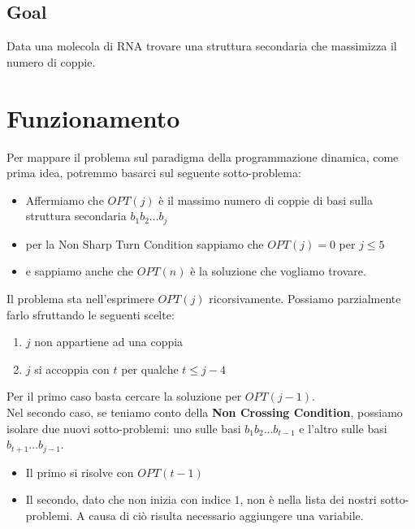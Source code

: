 \subsection{Goal}

Data una molecola di RNA trovare una struttura secondaria che massimizza
il numero di coppie.

\section{Funzionamento}

Per mappare il problema sul paradigma della programmazione dinamica,
come prima idea, potremmo basarci sul seguente sotto-problema:
\begin{myblockquote}
  \begin{itemize}
    \item Affermiamo che $OPT(j)$ è il massimo numero di coppie
          di basi sulla struttura secondaria $b_1 b_2 \ldots b_j$
    \item per la Non Sharp Turn Condition sappiamo che
          $OPT(j) = 0$ per $j \leq 5$
    \item e sappiamo anche che
          $OPT(n)$ è la soluzione che vogliamo trovare.
  \end{itemize}
\end{myblockquote}


Il problema sta nell'esprimere $OPT(j)$ ricorsivamente. Possiamo
parzialmente farlo sfruttando le seguenti scelte:
\begin{enumerate}
  \item $j$ non appartiene ad una coppia
  \item $j$ si accoppia con $t$ per qualche $t \leq j - 4$
\end{enumerate}

Per il primo caso basta cercare la soluzione per $OPT(j - 1)$.\\
Nel secondo caso, se teniamo conto della \textbf{Non Crossing
  Condition}, possiamo isolare due nuovi sotto-problemi: uno sulle basi
$b_1 b_2 \ldots b_{t-1}$ e l'altro sulle basi
$b_{t+1} \ldots b_{j-1}$.

\begin{itemize}
  \item
        Il primo si risolve con $OPT(t-1)$
  \item
        Il secondo, dato che non inizia con indice $1$, non è nella lista
        dei nostri sotto-problemi. A causa di ciò risulta necessario
        aggiungere una variabile.
\end{itemize}

